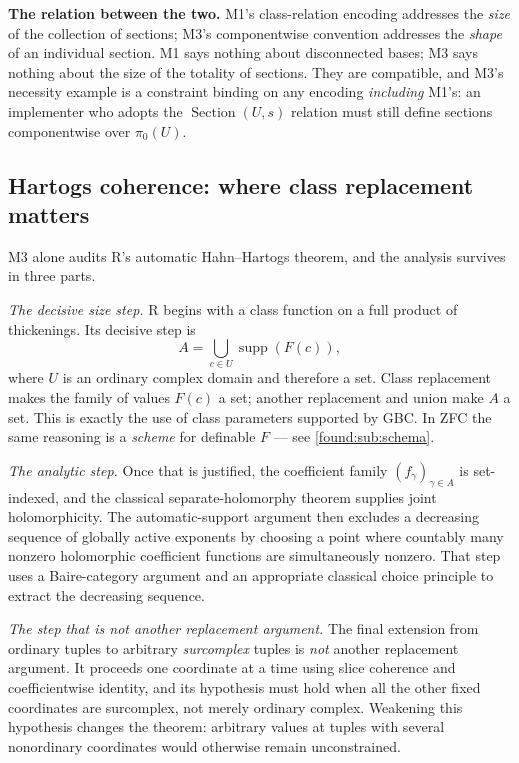 \documentclass[11pt,letterpaper]{article}
\numberwithin{equation}{section}
\theoremstyle{definition}
\theoremstyle{remark}
\newcommand{\supp}{\operatorname{supp}}
\begin{document}
\medskip\noindent
\textbf{The relation between the two.} M1's class-relation encoding addresses the
\emph{size} of the collection of sections; M3's componentwise convention
addresses the \emph{shape} of an individual section. M1 says nothing about
disconnected bases; M3 says nothing about the size of the totality of sections.
They are compatible, and M3's necessity example is a constraint binding on any
encoding \emph{including} M1's: an implementer who adopts the
$\operatorname{Section}(U,s)$ relation must still define sections componentwise
over $\pi_0(U)$.

\subsection{Hartogs coherence: where class replacement matters}
\label{found:sub:hartogs}
M3 alone audits R's automatic Hahn--Hartogs theorem, and the analysis survives
in three parts.

\emph{The decisive size step.} R begins with a class function on a full product
of thickenings. Its decisive step is
\begin{equation}\label{found:eq:hartogssupport}
 A=\bigcup_{c\in U}\supp(F(c)),
\end{equation}
where $U$ is an ordinary complex domain and therefore a set. Class replacement
makes the family of values $F(c)$ a set; another replacement and union make $A$
a set. This is exactly the use of class parameters supported by GBC. In ZFC the
same reasoning is a \emph{scheme} for definable $F$ --- see
\cref{found:sub:schema}.

\emph{The analytic step.} Once that is justified, the coefficient family
$(f_\gamma)_{\gamma\in A}$ is set-indexed, and the classical
separate-holomorphy theorem supplies joint holomorphicity. The automatic-support
argument then excludes a decreasing sequence of globally active exponents by
choosing a point where countably many nonzero holomorphic coefficient functions
are simultaneously nonzero. That step uses a Baire-category argument and an
appropriate classical choice principle to extract the decreasing sequence.

\emph{The step that is not another replacement argument.} The final extension
from ordinary tuples to arbitrary \emph{surcomplex} tuples is \emph{not} another
replacement argument. It proceeds one coordinate at a time using slice coherence
and coefficientwise identity, and its hypothesis must hold when all the other
fixed coordinates are surcomplex, not merely ordinary complex. Weakening this
hypothesis changes the theorem: arbitrary values at tuples with several
nonordinary coordinates would otherwise remain unconstrained.
\end{document}
